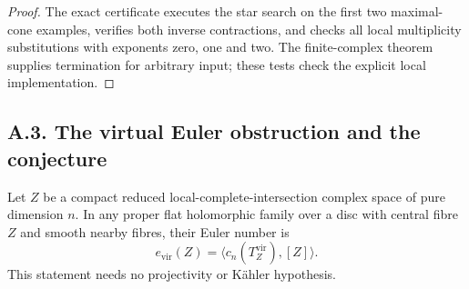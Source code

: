 \begin{proof}
The exact certificate
executes the star search on the first two
maximal-cone examples, verifies both inverse
contractions, and checks all local multiplicity
substitutions with exponents zero, one and two.
The finite-complex theorem supplies termination for
arbitrary input; these tests check the explicit
local implementation.
\end{proof}


\subsection{A.3. The virtual Euler obstruction and the conjecture}

\begin{lemma}\label{push:src:A.3.1}\label{push:A31}
Let $Z$ be a compact reduced local-complete-intersection complex
space of pure dimension $n$. In any proper flat holomorphic
family over a disc with central fibre $Z$ and smooth nearby
fibres, their Euler number is
\[
 e_{\mathrm{vir}}(Z)=\langle c_n(T_Z^{\mathrm{vir}}),[Z]\rangle.
\]
This statement needs no projectivity or K\"ahler hypothesis.
\end{lemma}
